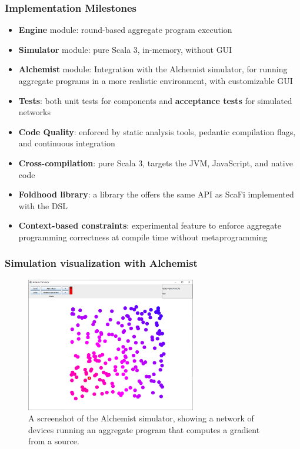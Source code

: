 \begin{frame}
    \frametitle{Implementation Milestones}
    \begin{itemize}
        \item \textbf{Engine} module: round-based aggregate program execution
        \item \textbf{Simulator} module: pure Scala 3, in-memory, without \ac{GUI}
        \item \textbf{Alchemist} module: Integration with the Alchemist simulator, for running aggregate programs in a more realistic environment, with customizable \ac{GUI}
        \item \textbf{Tests}: both unit tests for components and \textbf{acceptance tests} for simulated networks
        \item \textbf{Code Quality}: enforced by static analysis tools, pedantic compilation flags, and continuous integration
        \item \textbf{Cross-compilation}: pure Scala 3, targets the \ac{JVM}, JavaScript, and native code
        \item \textbf{Foldhood library}: a library the offers the same \ac{API} as ScaFi implemented with the \ac{DSL}
        \item \textbf{Context-based constraints}: experimental feature to enforce aggregate programming correctness at compile time without metaprogramming
    \end{itemize}
\end{frame}

\begin{frame}
    \frametitle{Simulation visualization with Alchemist}
    \begin{figure}
        \label{fig:alchemist-demo}
        \centering
        \includegraphics[width=0.66\textwidth]{figures/alchemist-demo.png}
        \caption{A screenshot of the Alchemist simulator, showing a network of devices running an aggregate program that computes a gradient from a source.}
    \end{figure}
\end{frame}

